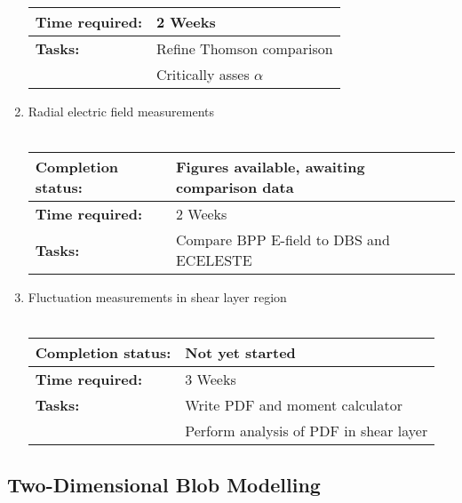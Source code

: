 \documentclass[11pt]{article}
\begin{document}
\begin{enumerate}
\begin{tabular}{l l}
\hline
  \textbf{Time required:} & 2 Weeks \\
\hline
\textbf{Tasks:} & Refine Thomson comparison \\
 & Critically asses $\alpha$ 
\end{tabular}
\item Radial electric field measurements\\ \\
\begin{tabular}{l l}
\hline
\textbf{Completion status:} &  Figures available, awaiting comparison data \\
\hline
  \textbf{Time required:} & 2 Weeks \\
\hline
\textbf{Tasks:} & Compare BPP E-field to DBS and ECELESTE
\end{tabular}
\item Fluctuation measurements in shear layer region\\ \\
\begin{tabular}{l l}
\hline
\textbf{Completion status:} &  Not yet started \\
\hline
  \textbf{Time required:} & 3 Weeks \\
\hline
\textbf{Tasks:} & Write PDF and moment calculator\\
 & Perform analysis of PDF in shear layer
\end{tabular}



\end{enumerate}
\subsection{Two-Dimensional Blob Modelling}
\newpage
\end{document}

